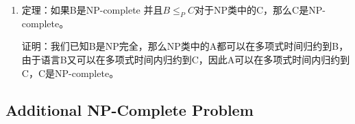 \documentclass[UTF8]{ctexart}
\begin{document}
\begin{itemize}
\begin{enumerate}
        证明：根据B的定义，每一个在NP类中的A是多项式时间归约到B，B又属于P类，那么A同样属于P类，根据Cook-Levin定理，推出P=NP。

        \item 定理：如果B是NP-complete 并且$B\leqslant_{P} C$对于NP类中的C，那么C是NP-complete。
        
        证明：我们已知B是NP完全，那么NP类中的A都可以在多项式时间归约到B，由于语言B又可以在多项式时间内归约到C，因此A可以在多项式时间内归约到C，C是NP-complete。

    \end{enumerate}

\end{itemize}

\subsection{Additional NP-Complete Problem}
\end{document}
